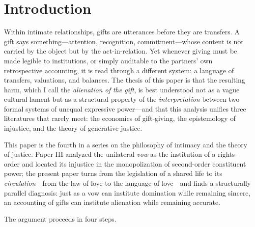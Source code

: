\documentclass[11pt,a4paper]{article}
\begin{document}
\tableofcontents
\clearpage

\section{Introduction}
\label{p04:sec:intro}

Within intimate relationships, gifts are utterances before they are
transfers. A gift says something---attention, recognition, commitment---whose
content is not carried by the object but by the act-in-relation. Yet whenever
giving must be made legible to institutions, or simply auditable to the
partners' own retrospective accounting, it is read through a different
system: a language of transfers, valuations, and balances. The thesis of this
paper is that the resulting harm, which I call the \emph{alienation of the
gift}, is best understood not as a vague cultural lament but as a structural
property of the \emph{interpretation} between two formal systems of unequal
expressive power---and that this analysis unifies three literatures that
rarely meet: the economics of gift-giving, the epistemology of injustice, and
the theory of generative justice.

This paper is the fourth in a series on the philosophy of intimacy and the
theory of justice. Paper III \parencite{huang2026vow} analyzed the unilateral
\emph{vow} as the institution of a rights-order and located its injustice in
the monopolization of second-order constituent power; the present paper turns
from the legislation of a shared life to its \emph{circulation}---from the
law of love to the language of love---and finds a structurally parallel
diagnosis: just as a vow can institute domination while remaining sincere,
an accounting of gifts can institute alienation while remaining accurate.

The argument proceeds in four steps.
\end{document}
